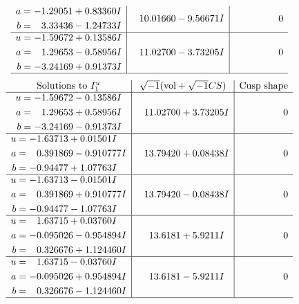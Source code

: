 \documentclass[1p]{elsarticle_modified}
\theoremstyle{definition}
\newcommand{\I}{\sqrt{-1}}
\begin{document}
$$\begin{array}{c|c|c}
\begin{aligned}
a &= -1.29051 + 0.83360 I \\
b &= \phantom{-}3.33436 - 1.24733 I\end{aligned}
 & \phantom{-}10.01660 - 9.56671 I & \phantom{-0.000000 } 0 \\ \hline\begin{aligned}
u &= -1.59672 + 0.13586 I \\
a &= \phantom{-}1.29653 - 0.58956 I \\
b &= -3.24169 + 0.91373 I\end{aligned}
 & \phantom{-}11.02700 - 3.73205 I & \phantom{-0.000000 } 0\\
 \hline 
 \end{array}$$\newpage$$\begin{array}{c|c|c}  
\text{Solutions to }I^u_{1}& \I (\text{vol} + \sqrt{-1}CS) & \text{Cusp shape}\\
 \hline 
\begin{aligned}
u &= -1.59672 - 0.13586 I \\
a &= \phantom{-}1.29653 + 0.58956 I \\
b &= -3.24169 - 0.91373 I\end{aligned}
 & \phantom{-}11.02700 + 3.73205 I & \phantom{-0.000000 } 0 \\ \hline\begin{aligned}
u &= -1.63713 + 0.01501 I \\
a &= \phantom{-}0.391869 - 0.910777 I \\
b &= -0.94477 + 1.07763 I\end{aligned}
 & \phantom{-}13.79420 + 0.08438 I & \phantom{-0.000000 } 0 \\ \hline\begin{aligned}
u &= -1.63713 - 0.01501 I \\
a &= \phantom{-}0.391869 + 0.910777 I \\
b &= -0.94477 - 1.07763 I\end{aligned}
 & \phantom{-}13.79420 - 0.08438 I & \phantom{-0.000000 } 0 \\ \hline\begin{aligned}
u &= \phantom{-}1.63715 + 0.03760 I \\
a &= -0.095026 - 0.954894 I \\
b &= \phantom{-}0.326676 + 1.124460 I\end{aligned}
 & \phantom{-}13.6181 + 5.9211 I & \phantom{-0.000000 } 0 \\ \hline\begin{aligned}
u &= \phantom{-}1.63715 - 0.03760 I \\
a &= -0.095026 + 0.954894 I \\
b &= \phantom{-}0.326676 - 1.124460 I\end{aligned}
 & \phantom{-}13.6181 - 5.9211 I & \phantom{-0.000000 } 0\\
 \hline 
 \end{array}$$\newpage\newpage\renewcommand{\arraystretch}{1}
\end{document}
